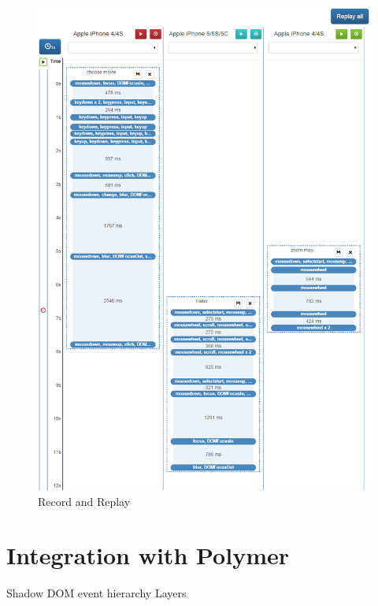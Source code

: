 \begin{figure}[H]
  \centering
    \includegraphics[width=1.0\textwidth]{images/screenshots/record_replay.png}
	\caption{Record and Replay}
	\label{fig:record_replay}
\end{figure}

\section{Integration with Polymer}
Shadow DOM event hierarchy
Layers

